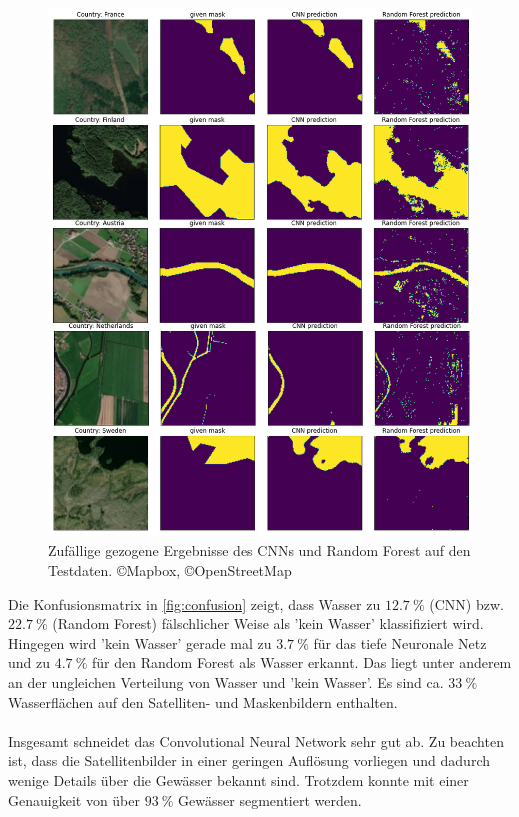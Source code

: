 \begin{figure}
    \centering
    \includegraphics[width=\textwidth]{content/img/ergebnisse_bilder.png}
    \caption{Zufällige gezogene Ergebnisse des CNNs und Random Forest auf den Testdaten. \copyright Mapbox, \copyright OpenStreetMap}
    \label{fig:ergebnisse_bilder}
\end{figure}
Die Konfusionsmatrix in \autoref{fig:confusion} zeigt, dass Wasser zu $\SI{12.7}{\percent}$ (CNN) bzw. $\SI{22.7}{\percent}$ (Random Forest) fälschlicher Weise als 'kein Wasser' klassifiziert wird.
Hingegen wird 'kein Wasser' gerade mal zu $\SI{3.7}{\percent}$ für das tiefe Neuronale Netz und zu $\SI{4.7}{\percent}$ für den Random Forest als Wasser erkannt.
Das liegt unter anderem an der ungleichen Verteilung von Wasser und 'kein Wasser'.
Es sind ca. $\SI{33}{\percent}$ Wasserflächen auf den Satelliten- und Maskenbildern enthalten.
\\
\\
Insgesamt schneidet das Convolutional Neural Network sehr gut ab.
Zu beachten ist, dass die Satellitenbilder in einer geringen Auflösung vorliegen und dadurch wenige Details über die Gewässer bekannt sind.
Trotzdem konnte mit einer Genauigkeit von über $\SI{93}{\percent}$ Gewässer segmentiert werden.